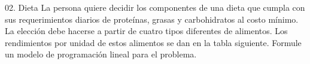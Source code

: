 \begin{frameExample}{02. Dieta}{}
  La persona quiere decidir los componentes de una dieta que cumpla con sus requerimientos diarios de proteínas, grasas y carbohidratos al costo mínimo. La elección debe hacerse a partir de cuatro tipos diferentes de alimentos. Los rendimientos por unidad de estos alimentos se dan en la tabla siguiente. Formule un modelo de programación lineal para el problema.
  
  {\centering
\par}

  
\end{frameExample}



